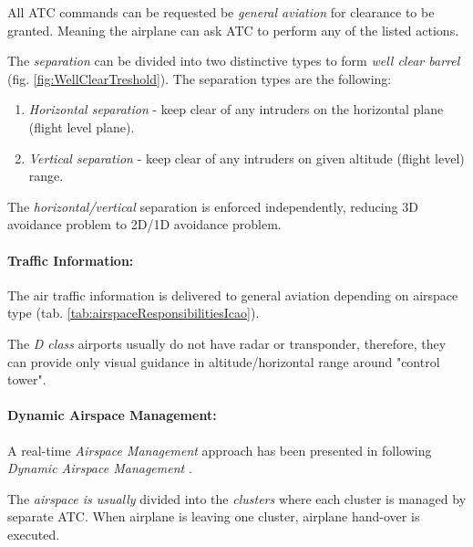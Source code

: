 \begin{note}
    All ATC commands can be requested be \emph{general aviation} for clearance to be granted. Meaning the airplane can ask ATC to perform any of the listed actions. 
\end{note}

The \emph{separation} can be divided into two distinctive types to form \emph{well clear barrel} (fig. \ref{fig:WellClearTreshold}). The separation types are the following:

\begin{enumerate}
    \item \emph{Horizontal separation} - keep clear of any intruders on the horizontal plane (flight level plane).
    
    \item \emph{Vertical separation} - keep clear of any intruders on given altitude (flight level) range.
\end{enumerate}

\begin{note}
    The \emph{horizontal/vertical} separation is enforced independently, reducing 3D avoidance problem to 2D/1D avoidance problem.
\end{note}

\paragraph{Traffic Information:} The air traffic information is delivered to general aviation depending on airspace type (tab. \ref{tab:airspaceResponsibilitiesIcao}). 

\begin{note}
    The \emph{D class} airports usually do not have radar or transponder, therefore, they can provide only visual guidance in altitude/horizontal range around "control tower".
\end{note}


\paragraph{Dynamic Airspace Management:} A real-time \emph{Airspace Management} approach has been presented in \cite{gardi2014real} following \emph{Dynamic Airspace Management} \cite{gerdes2016dynamic}. 

The \emph{airspace is usually} divided into the \emph{clusters} where each cluster is managed by separate ATC. When airplane is leaving one cluster, airplane hand-over is executed.

